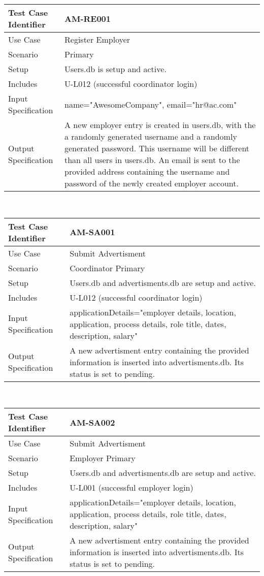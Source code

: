 \documentclass{l3deliverable}
\begin{document}

\begin{tabular}{lp{10cm}}
\hline 
\textbf{Test Case Identifier} & AM-RE001\tabularnewline
\hline 
\hline 
Use Case & Register Employer \tabularnewline
\hline 
Scenario & Primary \tabularnewline
\hline 
Setup & Users.db is setup and active.\tabularnewline
\hline 
Includes & U-L012 (successful coordinator login) \tabularnewline
\hline 
Input Specification & name="AwesomeCompany", email="hr@ac.com" \tabularnewline
\hline 
Output Specification & A new employer entry is created in users.db, with the a randomly generated username and a randomly generated password. This username will be different than all users in users.db. An email is sent to the provided address containing the username and password of the newly created employer account.\tabularnewline
\hline 
\end{tabular}\\


\begin{tabular}{lp{10cm}}
\hline 
\textbf{Test Case Identifier} & AM-SA001\tabularnewline
\hline 
\hline 
Use Case & Submit Advertisment \tabularnewline
\hline 
Scenario & Coordinator Primary \tabularnewline
\hline 
Setup & Users.db and advertisments.db are setup and active.\tabularnewline
\hline 
Includes & U-L012 (successful coordinator login) \tabularnewline
\hline 
Input Specification & applicationDetails="employer details, location, application, process details, role title, dates, description, salary" \tabularnewline
\hline 
Output Specification & A new advertisment entry containing the provided information is inserted into advertisments.db. Its status is set to pending.\tabularnewline
\hline 
\end{tabular}\\

\begin{tabular}{lp{10cm}}
\hline 
\textbf{Test Case Identifier} & AM-SA002\tabularnewline
\hline 
\hline 
Use Case & Submit Advertisment \tabularnewline
\hline 
Scenario & Employer Primary \tabularnewline
\hline 
Setup & Users.db and advertisments.db are setup and active.\tabularnewline
\hline 
Includes & U-L001 (successful employer login) \tabularnewline
\hline 
Input Specification & applicationDetails="employer details, location, application, process details, role title, dates, description, salary" \tabularnewline
\hline 
Output Specification & A new advertisment entry containing the provided information is inserted into advertisments.db. Its status is set to pending.\tabularnewline
\hline 
\end{tabular}\\
\end{document}
